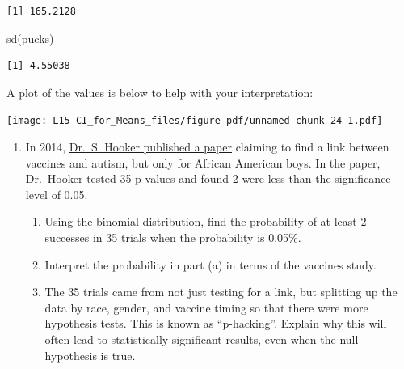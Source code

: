\documentclass[
  letterpaper,
  DIV=11,
  numbers=noendperiod,
  oneside]{scrreprt}
\newenvironment{Shaded}{\begin{snugshade}}{\end{snugshade}}
\newcommand{\FunctionTok}[1]{\textcolor[rgb]{0.28,0.35,0.67}{#1}}
\newcommand{\NormalTok}[1]{\textcolor[rgb]{0.00,0.23,0.31}{#1}}
\newcommand{\OtherTok}[1]{\textcolor[rgb]{0.00,0.23,0.31}{#1}}
\newcommand{\SpecialCharTok}[1]{\textcolor[rgb]{0.37,0.37,0.37}{#1}}
\newcommand{\StringTok}[1]{\textcolor[rgb]{0.13,0.47,0.30}{#1}}
\providecommand{\tightlist}{%
  \setlength{\itemsep}{0pt}\setlength{\parskip}{0pt}}\usepackage{longtable,booktabs,array}
\begin{document}
\begin{Shaded}
\end{Shaded}

\begin{verbatim}
[1] 165.2128
\end{verbatim}

\begin{Shaded}
\begin{Highlighting}[]
\FunctionTok{sd}\NormalTok{(pucks)}
\end{Highlighting}
\end{Shaded}

\begin{verbatim}
[1] 4.55038
\end{verbatim}

A plot of the values is below to help with your interpretation:

\texttt{[image: L15-CI\_for\_Means\_files/figure-pdf/unnamed-chunk-24-1.pdf]}

\begin{enumerate}
\def\labelenumi{\arabic{enumi}.}
\setcounter{enumi}{3}
\tightlist
\item
  In 2014,
  \href{https://www.ncbi.nlm.nih.gov/pmc/articles/PMC4128611/}{Dr.~S.
  Hooker published a paper} claiming to find a link between vaccines and
  autism, but only for African American boys. In the paper, Dr.~Hooker
  tested 35 p-values and found 2 were less than the significance level
  of 0.05.

  \begin{enumerate}
  \def\labelenumii{\alph{enumii}.}
  \tightlist
  \item
    Using the binomial distribution, find the probability of at least 2
    successes in 35 trials when the probability is 0.05\%.
  \item
    Interpret the probability in part (a) in terms of the vaccines
    study.
  \item
    The 35 trials came from not just testing for a link, but splitting
    up the data by race, gender, and vaccine timing so that there were
    more hypothesis tests. This is known as ``p-hacking''. Explain why
    this will often lead to statistically significant results, even when
    the null hypothesis is true.
  \end{enumerate}
\end{enumerate}
\end{document}
